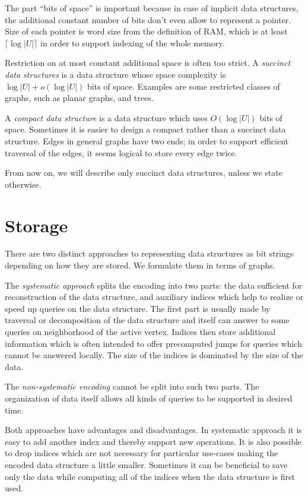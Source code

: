 The part ``bits of space'' is important because in case of implicit data structures, the additional constant number of bits don't even allow to represent a pointer.
Size of each pointer is word size from the definition of RAM, which is at least $\lceil \log |U| \rceil$ in order to support indexing of the whole memory.

Restriction on at most constant additional space is often too strict.
A \emph{succinct data structures} is a data structure whose space complexity is $ \log |U| + o(\log |U|) $ bits of space.
Examples are some restricted classes of graphs, such as planar graphs, and trees.

A \emph{compact data structure} is a data structure which uses $ O(\log |U|) $ bits of space.
Sometimes it is easier to design a compact rather than a succinct data structure.
Edges in general graphs have two ends; in order to support efficient traversal of the edges, it seems logical to store every edge twice.

From now on, we will describe only succinct data structures, unless we state otherwise.

\section{Storage}

There are two distinct approaches to representing data structures as bit strings depending on how they are stored.
We formulate them in terms of graphs.

The \emph{systematic approach} splits the encoding into two parts: the data sufficient for reconstruction of the data structure, and auxiliary indices which help to realize or speed up queries on the data structure.
The first part is usually made by traversal or decomposition of the data structure and itself can answer to some queries on neighborhood of the active vertex.
Indices then store additional information which is often intended to offer precomputed jumps for queries which cannot be answered locally.
The size of the indices is dominated by the size of the data.

The \emph{non-systematic encoding} cannot be split into such two parts.
The organization of data itself allows all kinds of queries to be supported in desired time.

Both approaches have advantages and disadvantages.
In systematic approach it is easy to add another index and thereby support new operations.
It is also possible to drop indices which are not necessary for particular use-cases making the encoded data structure a little smaller.
Sometimes it can be beneficial to save only the data while computing all of the indices when the data structure is first used.

